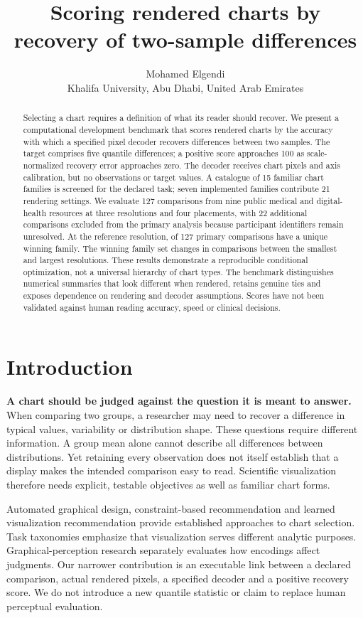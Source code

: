 \documentclass[11pt]{article}
\title{Scoring rendered charts by recovery of two-sample differences}
\author{Mohamed Elgendi\\Khalifa University, Abu Dhabi, United Arab Emirates}
\date{}
\begin{document}
\maketitle
\begin{abstract}
Selecting a chart requires a definition of what its reader should recover. We present a computational development benchmark that scores rendered charts by the accuracy with which a specified pixel decoder recovers differences between two samples. The target comprises five quantile differences; a positive score approaches 100 as scale-normalized recovery error approaches zero. The decoder receives chart pixels and axis calibration, but no observations or target values. A catalogue of 15 familiar chart families is screened for the declared task; seven implemented families contribute 21 rendering settings. We evaluate 127 comparisons from nine public medical and digital-health resources at three resolutions and four placements, with 22 additional comparisons excluded from the primary analysis because participant identifiers remain unresolved. At the reference resolution, \UniqueWinners{} of 127 primary comparisons have a unique winning family. The winning family set changes in \ResolutionChanges{} comparisons between the smallest and largest resolutions. These results demonstrate a reproducible conditional optimization, not a universal hierarchy of chart types. The benchmark distinguishes numerical summaries that look different when rendered, retains genuine ties and exposes dependence on rendering and decoder assumptions. Scores have not been validated against human reading accuracy, speed or clinical decisions.
\end{abstract}

\section*{Introduction}
\textbf{A chart should be judged against the question it is meant to answer.} When comparing two groups, a researcher may need to recover a difference in typical values, variability or distribution shape. These questions require different information. A group mean alone cannot describe all differences between distributions.\cite{weissgerber2015,rousselet2017} Yet retaining every observation does not itself establish that a display makes the intended comparison easy to read. Scientific visualization therefore needs explicit, testable objectives as well as familiar chart forms.\cite{elgendi2017,elgendi2020}

Automated graphical design, constraint-based recommendation and learned visualization recommendation provide established approaches to chart selection.\cite{mackinlay1986,draco,vizml} Task taxonomies emphasize that visualization serves different analytic purposes.\cite{amar2005} Graphical-perception research separately evaluates how encodings affect judgments.\cite{cleveland1984} Our narrower contribution is an executable link between a declared comparison, actual rendered pixels, a specified decoder and a positive recovery score. We do not introduce a new quantile statistic or claim to replace human perceptual evaluation.
\end{document}
